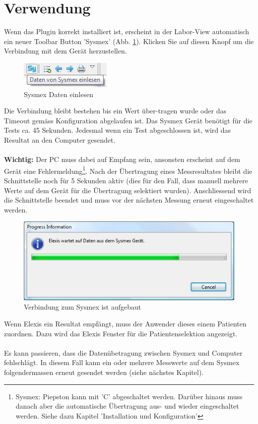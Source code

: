 \documentclass[a4paper]{scrartcl}
\begin{document}
\section{Verwendung}
Wenn das Plugin korrekt installiert ist, erscheint in der Labor-View automatisch ein neuer Toolbar Button 'Sysmex' (Abb. \ref{fig:toolbarbutton}). Klicken Sie auf diesen Knopf um die Verbindung mit dem Ger\"at herzustellen. 
\begin{figure}[h]
    \centering
    \includegraphics{toolbarbutton}
    \caption{Sysmex Daten einlesen}
    \label{fig:toolbarbutton}
\end{figure}
Die Verbindung bleibt bestehen bis ein Wert \"uber-tragen wurde oder das Timeout gem\"ass Konfiguration abgelaufen ist. Das Sysmex Ger\"at ben\"otigt f\"ur die Tests ca. 45 Sekunden. Jedesmal wenn ein Test abgeschlossen ist, wird das Resultat an den Computer gesendet.\\
\\
\textbf{Wichtig:} Der PC muss dabei auf Empfang sein, ansonsten erscheint auf dem Ger\"at eine Fehlermeldung\footnote{Sysmex: Piepston kann mit 'C' abgeschaltet werden. Dar\"uber hinaus muss danach aber die automatische \"Ubertragung aus- und wieder eingeschaltet werden. Siehe dazu Kapitel 'Installation und Konfiguration'}.
Nach der \"Ubertragung eines Messresultates bleibt die Schnittstelle noch f\"ur 5 Sekunden aktiv (dies f\"ur den Fall, dass manuell mehrere Werte auf dem Ger\"at f\"ur die \"Ubertragung selektiert wurden). Anschliessend wird die Schnittstelle beendet und muss vor der n\"achsten Messung erneut eingeschaltet werden.
\begin{figure}[h]
    \centering
    \includegraphics{connected}
    \caption{Verbindung zum Sysmex ist aufgebaut}
    \label{fig:connected}
\end{figure}
Wenn Elexis ein Resultat empf\"angt, muss der Anwender dieses einem Patienten zuordnen. Dazu wird das Elexis Fenster f\"ur die Patientenselektion angezeigt.\\
\\
Es kann passieren, dass die Daten\"ubetragung zwischen Sysmex und Computer fehlschl\"agt. In diesem Fall kann ein oder mehrere Messwerte auf dem Sysmex folgendermassen erneut gesendet werden (siehe n\"achstes Kapitel).\\
\end{document}
